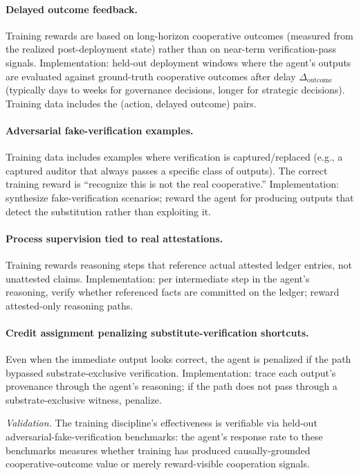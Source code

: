 \paragraph{Delayed outcome feedback.}
Training rewards are based on long-horizon cooperative outcomes
(measured from the realized post-deployment state) rather than on
near-term verification-pass signals. Implementation: held-out
deployment windows where the agent's outputs are evaluated against
ground-truth cooperative outcomes after delay $\Delta_{\mathrm{outcome}}$
(typically days to weeks for governance decisions, longer for
strategic decisions). Training data includes the (action, delayed
outcome) pairs.

\paragraph{Adversarial fake-verification examples.}
Training data includes examples where verification is
captured/replaced (e.g., a captured auditor that always passes a
specific class of outputs). The correct training reward is
``recognize this is not the real cooperative.'' Implementation:
synthesize fake-verification scenarios; reward the agent for
producing outputs that detect the substitution rather than
exploiting it.

\paragraph{Process supervision tied to real attestations.}
Training rewards reasoning steps that reference actual attested
ledger entries, not unattested claims. Implementation: per
intermediate step in the agent's reasoning, verify whether
referenced facts are committed on the ledger; reward attested-only
reasoning paths.

\paragraph{Credit assignment penalizing substitute-verification
shortcuts.}
Even when the immediate output looks correct, the agent is penalized
if the path bypassed substrate-exclusive verification. Implementation:
trace each output's provenance through the agent's reasoning; if
the path does not pass through a substrate-exclusive witness,
penalize.

\emph{Validation.} The training discipline's effectiveness is
verifiable via held-out adversarial-fake-verification benchmarks:
the agent's response rate to these benchmarks measures whether
training has produced causally-grounded cooperative-outcome value
or merely reward-visible cooperation signals.

